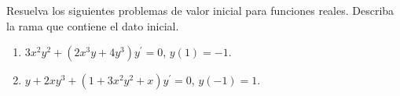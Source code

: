 Resuelva los siguientes problemas de valor inicial para funciones reales. Describa la rama que contiene el dato inicial.

\begin{enumerate}[label=(\alph*),ref=\alph*,leftmargin=*]
\item $3x^2y^2+(2x^3y+4y^3)y^{\prime}=0$, $y(1)=-1$.
\item $y+2xy^3+(1+3x^2y^2+x)y^{\prime}=0$, $y(-1)=1$.
\end{enumerate}
